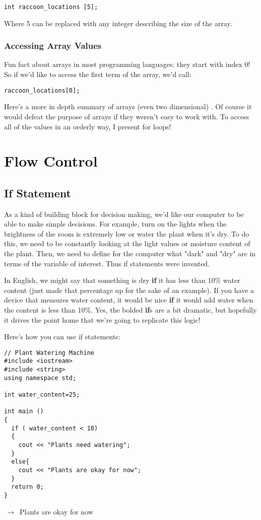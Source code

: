 \documentclass[a4paper]{article}
\begin{document}
\begin{verbatim}
int raccoon_locations [5];
\end{verbatim}

Where 5 can be replaced with any integer describing the size of the array.

\subsubsection{Accessing Array Values}
Fun fact about arrays in most programming languages: they start with index 0! So if we'd like to access the first term of the array, we'd call:

\begin{verbatim}
raccoon_locations[0];
\end{verbatim}

Here's a more in depth summary of arrays (even two dimensional) \cite{cpp_array}. Of course it would defeat the purpose of arrays if they weren't easy to work with. To access all of the values in an orderly way, I present for loops!

\newpage
\section{Flow Control}
\subsection{If Statement}
As a kind of building block for decision making, we'd like our computer to be able to make simple decisions. For example, turn on the lights when the brightness of the room is extremely low or water the plant when it's dry. To do this, we need to be constantly looking at the light values or moisture content of the plant. Then, we need to define for the computer what "dark" and "dry" are in terms of the variable of interest. Thus if statements were invented.

In English, we might say that something is dry \textbf{if} it has less than 10\% water content (just made that percentage up for the sake of an example). If you have a device that measures water content, it would be nice \textbf{if} it would add water when the content is less than 10\%. Yes, the bolded \textbf{if}s are a bit dramatic, but hopefully it drives the point home that we're going to replicate this logic!

Here's how you can use if statements:
\begin{verbatim}
// Plant Watering Machine
#include <iostream>
#include <string>
using namespace std;

int water_content=25;

int main ()
{
  if ( water_content < 10)
  {
    cout << "Plants need watering";
  }
  else{
    cout << "Plants are okay for now";
  }
  return 0;
}
\end{verbatim}
$\,\to\,$ Plants are okay for now
\end{document}
